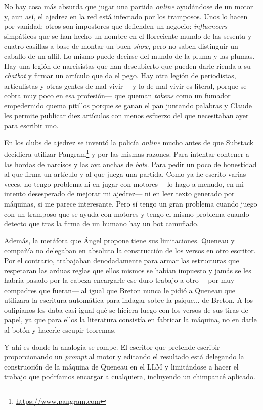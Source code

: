 \documentclass[11pt,a4paper]{article}
\begin{document}
No hay cosa más absurda que jugar una partida \emph{online} ayudándose de un motor y, aun así, el ajedrez en la red está infectado por los tramposos. Unos lo hacen por vanidad; otros son impostores que defienden un negocio: \emph{influencers} simpáticos que se han hecho un nombre en el floreciente mundo de las sesenta y cuatro casillas a base de montar un buen \emph{show}, pero no saben distinguir un caballo de un alfil. Lo mismo puede decirse del mundo de la pluma y las plumas. Hay una legión de narcisistas que han descubierto que pueden darle rienda a su \emph{chatbot} y firmar un artículo que da el pego. Hay otra legión de periodistas, articulistas y otras gentes de mal vivir ---y lo de mal vivir es literal, porque se cobra muy poco en esa profesión--- que queman \emph{tokens} como un fumador empedernido quema pitillos porque se ganan el pan juntando palabras y Claude les permite publicar diez artículos con menos esfuerzo del que necesitaban ayer para escribir uno. 

En los clubs de ajedrez se inventó la policía \emph{online} mucho antes de que Substack decidiera utilizar Pangram\footnote{\url{https://www.pangram.com}} y por las mismas razones. Para intentar contener a las hordas de narcisos y las avalanchas de \emph{bots}. Para pedir un poco de honestidad al que firma un artículo y al que juega una partida. Como ya he escrito varias veces, no tengo problema ni en jugar con motores ---lo hago a menudo, en mi intento desesperado de mejorar mi ajedrez--- ni en leer texto generado por máquinas, si me parece interesante. Pero sí tengo un gran problema cuando juego con un tramposo que se ayuda con motores y tengo el mismo problema cuando detecto que tras la firma de un humano hay un bot camuflado. 

Además, la metáfora que Ángel propone tiene sus limitaciones. Queneau y compañía no delegaban en absoluto la construcción de los versos en otro escritor. Por el contrario, trabajaban denodadamente para armar las estructuras que respetaran las arduas reglas que ellos mismos se habían impuesto y jamás se les habría pasado por la cabeza encargarle ese duro trabajo a otro ---por muy compadres que fueran--- al igual que Breton nunca le pidió a Queneau que utilizara la escritura automática para indagar sobre la psique... de Breton. A los oulipianos les daba casi igual qué se hiciera luego con los versos de sus tiras de papel, ya que para ellos la literatura consistía en fabricar la máquina, no en darle al botón y hacerle escupir teoremas. 

Y ahí es donde la analogía se rompe. El escritor que pretende escribir proporcionando un \emph{prompt} al motor y editando el resultado está delegando la construcción de la máquina de Queneau en el LLM y limitándose a hacer el trabajo que podríamos encargar a cualquiera, incluyendo un chimpancé aplicado. 
\end{document}
